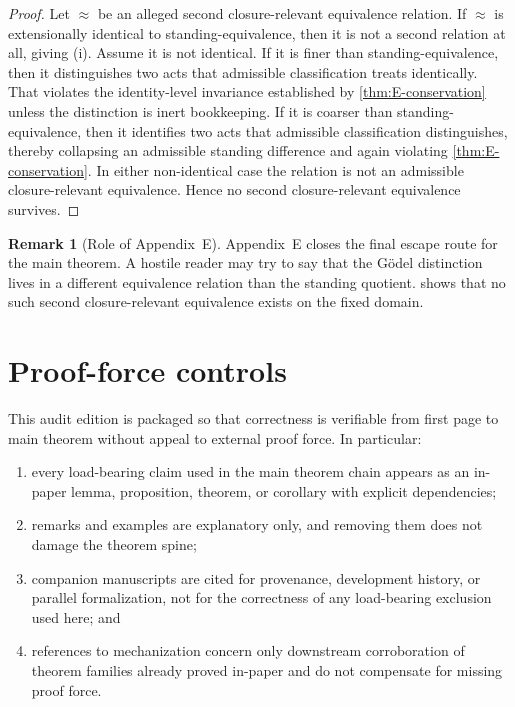 \documentclass[11pt]{article}
\theoremstyle{plain}
\theoremstyle{definition}
\newtheorem{remark}[theorem]{Remark}
\begin{document}
\begin{proof}
Let $\approx$ be an alleged second closure-relevant equivalence relation. If $\approx$ is extensionally identical to standing-equivalence, then it is not a second relation at all, giving (i). Assume it is not identical. If it is finer than standing-equivalence, then it distinguishes two acts that admissible classification treats identically. That violates the identity-level invariance established by \cref{thm:E-conservation} unless the distinction is inert bookkeeping. If it is coarser than standing-equivalence, then it identifies two acts that admissible classification distinguishes, thereby collapsing an admissible standing difference and again violating \cref{thm:E-conservation}. In either non-identical case the relation is not an admissible closure-relevant equivalence. Hence no second closure-relevant equivalence survives.
\end{proof}

\begin{remark}[Role of Appendix~E]
Appendix~E closes the final escape route for the main theorem. A hostile reader may try to say that the G\"odel distinction lives in a different equivalence relation than the standing quotient.  shows that no such second closure-relevant equivalence exists on the fixed domain.
\end{remark}

\section{Proof-force controls}

This audit edition is packaged so that correctness is verifiable from first page to main theorem without appeal to external proof force. In particular:
\begin{enumerate}[label=(\roman*), leftmargin=2.5em]
    \item every load-bearing claim used in the main theorem chain appears as an in-paper lemma, proposition, theorem, or corollary with explicit dependencies;
    \item remarks and examples are explanatory only, and removing them does not damage the theorem spine;
    \item companion manuscripts are cited for provenance, development history, or parallel formalization, not for the correctness of any load-bearing exclusion used here; and
    \item references to mechanization concern only downstream corroboration of theorem families already proved in-paper and do not compensate for missing proof force.
\end{enumerate}
\end{document}
